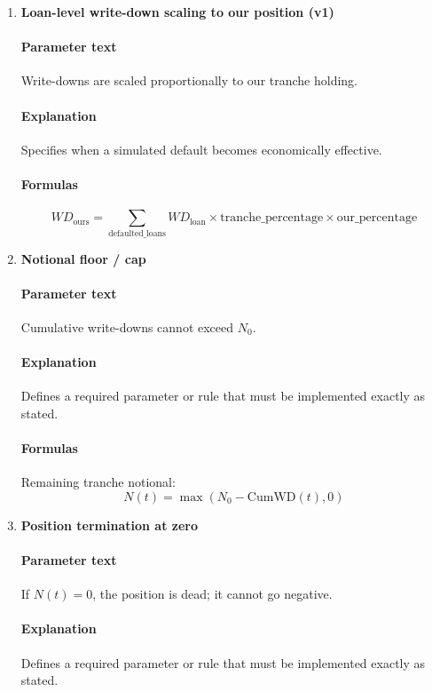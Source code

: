 \documentclass[11pt]{article}
\begin{document}
\begin{enumerate}[label=\arabic*),leftmargin=*,align=left]
\paragraph{Formulas} 
\[ N_0 = N_{\text{ref}} \times \text{tranche\_percentage} \times \text{our\_percentage} \]

\item \textbf{Loan-level write-down scaling to our position (v1)}
\paragraph{Parameter text} Write-downs are scaled proportionally to our tranche holding.
\paragraph{Explanation} Specifies when a simulated default becomes economically effective.
\paragraph{Formulas} 
\[ WD_{\text{ours}} = \sum_{\text{defaulted\_loans}} WD_{\text{loan}} \times \text{tranche\_percentage} \times \text{our\_percentage} \]

\item \textbf{Notional floor / cap}
\paragraph{Parameter text} Cumulative write-downs cannot exceed $N_0$.
\paragraph{Explanation} Defines a required parameter or rule that must be implemented exactly as stated.
\paragraph{Formulas} Remaining tranche notional:
\[ N(t) = \max(N_0 - \text{CumWD}(t), 0) \]

\item \textbf{Position termination at zero}
\paragraph{Parameter text} If $N(t)=0$, the position is dead; it cannot go negative.
\paragraph{Explanation} Defines a required parameter or rule that must be implemented exactly as stated.


\end{enumerate}
\end{document}
